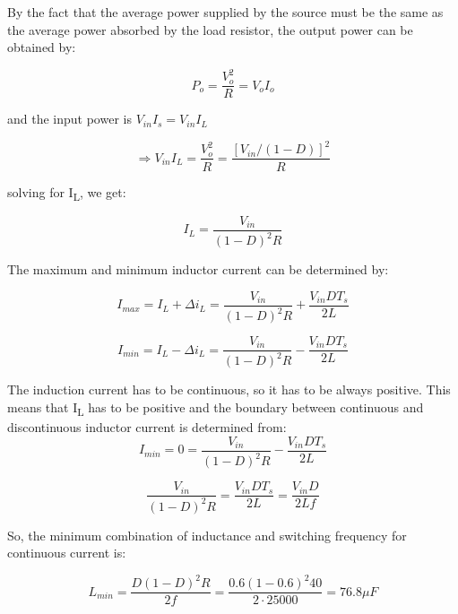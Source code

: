 By the fact that the average power supplied by the source must be the same as the average power absorbed by the load resistor, the output power can be obtained by:

\begin{equation}
	P_o = \frac{V^2_o}{R} = V_oI_o
	\label{eq:CBC_CVR4}
\end{equation}

and the input power is $V_{in}I_s = V_{in}I_L$

\begin{equation}
	\Rightarrow V_{in}I_L = \frac{V^2_o}{R} = \frac{[V_{in}/(1-D)]^2}{R}
	\label{eq:CBC_CVR4}
\end{equation}

solving for I\textsubscript{L}, we get:

\begin{equation}
	I_L = \frac{V_{in}}{(1-D)^2R}
	\label{eq:CBC_CVR4}
\end{equation}

The maximum and minimum inductor current can be determined by:

\begin{equation}
	I_{max} = I_L + \Delta i_L = \frac{V_{in}}{(1-D)^2R} + \frac{V_{in}DT_s}{2L}
	\label{eq:CBC_CVR4}
\end{equation}

\begin{equation}
	I_{min} = I_L - \Delta i_L = \frac{V_{in}}{(1-D)^2R} - \frac{V_{in}DT_s}{2L}
	\label{eq:CBC_CVR4}
\end{equation}


The induction current has to be continuous, so it has to be always positive. This means that I\textsubscript{L} has to be positive and the boundary between continuous and discontinuous inductor current is determined from:\\
\begin{equation}
	I_{min} = 0 = \frac{V_{in}}{(1-D)^2R} - \frac{V_{in}DT_s}{2L}
\end{equation}

\begin{equation}
	\frac{V_{in}}{(1-D)^2R} = \frac{V_{in}DT_s}{2L} = \frac{V_{in}D}{2Lf}
\end{equation}


So, the minimum combination of inductance and switching frequency for continuous current is:

\begin{equation}
L_{min} = \frac{D(1-D)^2R}{2f} = \frac{0.6(1-0.6)^2 40}{2\cdot25000} = 76.8\mu F
\end{equation}



